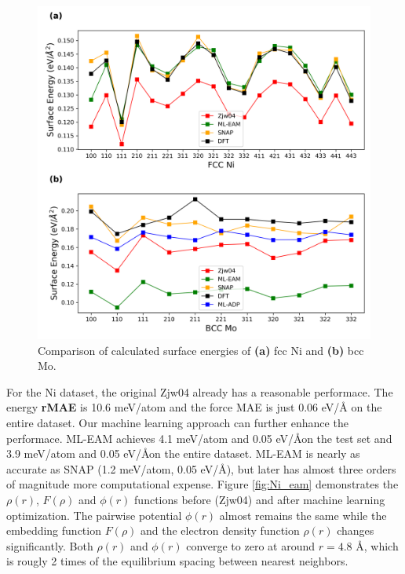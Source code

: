 \documentclass[prb,reprint,superscriptaddress]{revtex4-2}
\begin{document}
% 
%
\begin{figure}
\centering
\includegraphics[scale=0.4]{surface_energy.png}
\caption{\label{fig:surface_energy} Comparison of calculated surface energies of 
\textbf{(a)} fcc Ni and \textbf{(b)} bcc Mo.}
\end{figure}

For the Ni dataset, the original Zjw04 already has a reasonable performace. 
The energy \textbf{rMAE} is 10.6 meV/atom and the force MAE is just 0.06 eV/\AA 
on the entire dataset. Our machine learning approach can further enhance the 
performace. ML-EAM achieves 4.1 meV/atom and 0.05 eV/\AA on the test set and 
3.9 meV/atom and 0.05 eV/\AA on the entire dataset. ML-EAM is nearly as accurate 
as SNAP (1.2 meV/atom, 0.05 eV/\AA), but later has almost three orders of 
magnitude more computational expense. Figure \ref{fig:Ni_eam} demonstrates the 
$\rho(r)$, $F(\rho)$ and $\phi(r)$ functions before (Zjw04) and after machine 
learning optimization. The pairwise potential $\phi(r)$ almost remains the same 
while the embedding function $F(\rho)$ and the electron density function 
$\rho(r)$ changes significantly. Both $\rho(r)$ and $\phi(r)$ converge to zero 
at around $r=4.8$ \AA, which is rougly 2 times of the equilibrium spacing 
between nearest neighbors.
\end{document}
